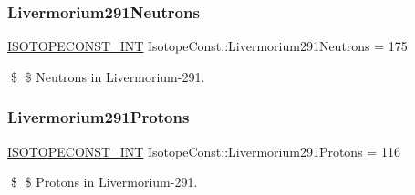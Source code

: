 \subsubsection{\texorpdfstring{Livermorium291\+Neutrons}{Livermorium291Neutrons}}
{\footnotesize\ttfamily \mbox{\hyperlink{group___isotope_const-_macros_ga5f18360b3e99483a35c32d789e62621c}{I\+S\+O\+T\+O\+P\+E\+C\+O\+N\+S\+T\+\_\+\+I\+NT}} Isotope\+Const\+::\+Livermorium291\+Neutrons = 175}

\$ \$ Neutrons in Livermorium-\/291. \mbox{\label{group___isotope_const-_livermorium-_lv291_ga4f959a704dcaf83ab8a25b9ec09a5373}} 
\subsubsection{\texorpdfstring{Livermorium291\+Protons}{Livermorium291Protons}}
{\footnotesize\ttfamily \mbox{\hyperlink{group___isotope_const-_macros_ga5f18360b3e99483a35c32d789e62621c}{I\+S\+O\+T\+O\+P\+E\+C\+O\+N\+S\+T\+\_\+\+I\+NT}} Isotope\+Const\+::\+Livermorium291\+Protons = 116}

\$ \$ Protons in Livermorium-\/291. 